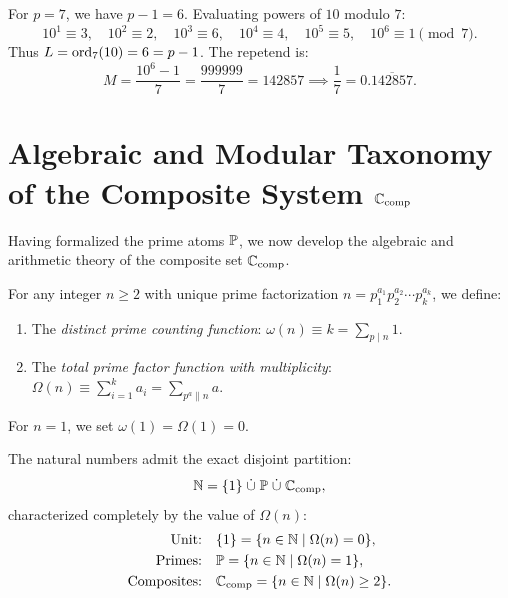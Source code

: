 \begin{example}[Full-Reptend Prime $p = 7$]
For $p = 7$, we have $p - 1 = 6$. Evaluating powers of $10$ modulo $7$:
$$10^1 \equiv 3, \quad 10^2 \equiv 2, \quad 10^3 \equiv 6, \quad 10^4 \equiv 4, \quad 10^5 \equiv 5, \quad 10^6 \equiv 1 \pmod 7.$$
Thus $L = \operatorname{ord}_7(10) = 6 = p - 1$. The repetend is:
$$M = \frac{10^6 - 1}{7} = \frac{999999}{7} = 142857 \implies \frac{1}{7} = 0.\overline{142857}.$$
\end{example}

\section{Algebraic and Modular Taxonomy of the Composite System \texorpdfstring{$\mathbb{C}_{\mathrm{comp}}$}{C_comp}}

Having formalized the prime atoms $\mathbb{P}$, we now develop the algebraic and arithmetic theory of the composite set $\mathbb{C}_{\mathrm{comp}}$.

\begin{definition}
\label{def:omega_Omega}
\leanok
For any integer $n \ge 2$ with unique prime factorization $n = p_1^{a_1} p_2^{a_2} \cdots p_k^{a_k}$, we define:
\begin{enumerate}
  \item The \emph{distinct prime counting function}: $\omega(n) \equiv k = \sum_{p \mid n} 1$.
  \item The \emph{total prime factor function with multiplicity}: $\Omega(n) \equiv \sum_{i=1}^k a_i = \sum_{p^a \parallel n} a$.
\end{enumerate}
For $n = 1$, we set $\omega(1) = \Omega(1) = 0$.
\end{definition}

\begin{proposition}
\label{prop:arithmetic_classification}
\leanok
The natural numbers admit the exact disjoint partition:
\begin{equation}
\mathbb{N} = \{1\} \;\dot{\cup}\; \mathbb{P} \;\dot{\cup}\; \mathbb{C}_{\mathrm{comp}},
\end{equation}
characterized completely by the value of $\Omega(n)$:
\begin{align}
\text{Unit:} \quad &\{1\} = \{n \in \mathbb{N} \mid \Omega(n) = 0\}, \\
\text{Primes:} \quad &\mathbb{P} = \{n \in \mathbb{N} \mid \Omega(n) = 1\}, \\
\text{Composites:} \quad &\mathbb{C}_{\mathrm{comp}} = \{n \in \mathbb{N} \mid \Omega(n) \ge 2\}.
\end{align}
\end{proposition}

